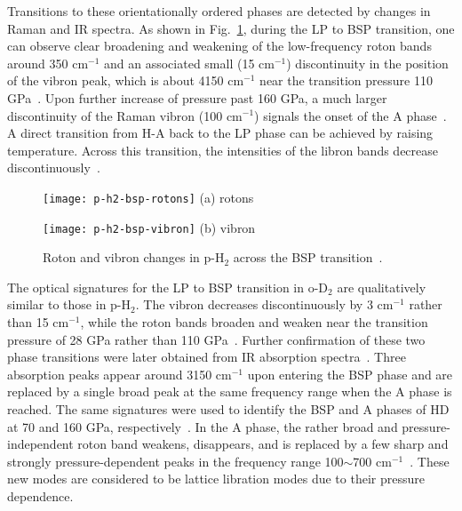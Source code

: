 Transitions to these orientationally ordered phases are detected by changes in Raman and IR spectra. As shown in Fig.~\ref{fig:hsolid-p-h2-bsp}, during the LP to BSP transition, one can observe clear broadening and weakening of the low-frequency roton bands around 350 cm$^{-1}$ and an associated small (15 cm$^{-1}$) discontinuity in the position of the vibron peak, which is about 4150 cm$^{-1}$ near the transition pressure 110 GPa~\cite{Lorenzana1990}. Upon further increase of pressure past 160 GPa, a much larger discontinuity of the Raman vibron (100 cm$^{-1}$) signals the onset of the A phase~\cite{Hemley1988,Lorenzana1989}. A direct transition from H-A back to the LP phase can be achieved by raising temperature. Across this transition, the intensities of the libron bands decrease discontinuously~\cite{Lorenzana1990}.

\begin{figure}[h]
\centering
\begin{minipage}{0.38\columnwidth}
\centering
\texttt{[image: p-h2-bsp-rotons]}
(a) rotons
\end{minipage}
\begin{minipage}{0.58\columnwidth}
\centering
\texttt{[image: p-h2-bsp-vibron]}
(b) vibron
\end{minipage}
\caption{Roton and vibron changes in p-H$_2$ across the BSP transition~\cite{Lorenzana1990}.}
\label{fig:hsolid-p-h2-bsp}
\end{figure}

The optical signatures for the LP to BSP transition in o-D$_2$ are qualitatively similar to those in p-H$_2$. The vibron decreases discontinuously by 3 cm$^{-1}$ rather than 15 cm$^{-1}$, while the roton bands broaden and weaken near the transition pressure of 28 GPa rather than 110 GPa~\cite{Silvera1981}. Further confirmation of these two phase transitions were later obtained from IR absorption spectra~\cite{Cui1994}. Three absorption peaks appear around 3150 cm$^{-1}$ upon entering the BSP phase and are replaced by a single broad peak at the same frequency range when the A phase is reached. The same signatures were used to identify the BSP and A phases of HD at 70 and 160 GPa, respectively~\cite{Chijioke2006}.
In the A phase, the rather broad and pressure-independent roton band weakens, disappears, and is replaced by a few sharp and strongly pressure-dependent peaks in the frequency range 100$\sim$700 cm$^{-1}$~\cite{Goncharov1998}.
These new modes are considered to be lattice libration modes due to their pressure dependence.

